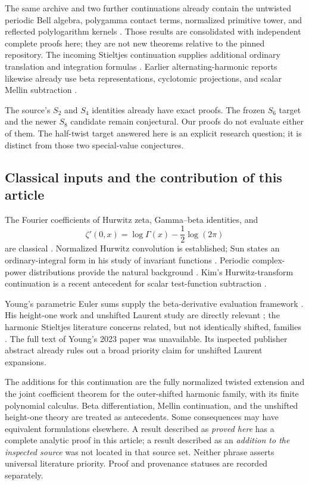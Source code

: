 The same archive and two further continuations already contain the
untwisted periodic Bell algebra, polygamma contact terms, normalized
primitive tower, and reflected polylogarithm kernels
\cite{RepoConvolutionAlgebra,RepoConvolutionCalculus,RepoShiftedJets}.
Those results are consolidated with independent complete proofs here;
they are not new theorems relative to the pinned repository.
The incoming Stieltjes continuation supplies additional ordinary
translation and integration formulas \cite{RepoIncoming}.
Earlier alternating-harmonic reports likewise already use beta
representations, cyclotomic projections, and scalar Mellin subtraction
\cite{RepoAlternating,RepoHarmonicGeometry}.

The source's \(S_2\) and \(S_4\) identities already have exact proofs.
The frozen \(S_6\) target and the newer \(S_8\) candidate remain
conjectural. Our proofs do not evaluate either of them.
The half-twist target answered here is an explicit research question;
it is distinct from those two special-value conjectures.

\subsection{Classical inputs and the contribution of this article}

The Fourier coefficients of Hurwitz zeta, Gamma--beta identities, and
\[
 \zeta'(0,x)=\log\Gamma(x)-\frac12\log(2\pi)
\]
are classical \cite{DLMFHurwitz,DLMFBeta}.
Normalized Hurwitz convolution is established; Sun states an
ordinary-integral form in his study of invariant functions
\cite[Remark 3.2 in the arXiv version]{per:Sun}.
Periodic complex-power distributions provide the natural background
\cite{per:GaySebbar}. Kim's Hurwitz-transform continuation is a recent
antecedent for scalar test-function subtraction \cite{Kim2026}.

Young's parametric Euler sums supply the beta-derivative evaluation
framework \cite{Young2026}. His height-one work and unshifted Laurent
study are directly relevant \cite{Young2024,Young2023}; the harmonic
Stieltjes literature concerns related, but not identically shifted,
families \cite{HarmonicStieltjes2023}. The full text of Young's 2023
paper was unavailable. Its inspected publisher abstract already rules
out a broad priority claim for unshifted Laurent expansions.

The additions for this continuation are the fully normalized twisted
extension and the joint coefficient theorem for the outer-shifted
harmonic family, with its finite polynomial calculus.
Beta differentiation, Mellin continuation, and the unshifted height-one
theory are treated as antecedents. Some consequences may have
equivalent formulations elsewhere. A result described as \emph{proved
here} has a complete analytic proof in this article; a result described
as an \emph{addition to the inspected source} was not located in that
source set. Neither phrase asserts universal literature priority.
Proof and provenance statuses are recorded separately.

